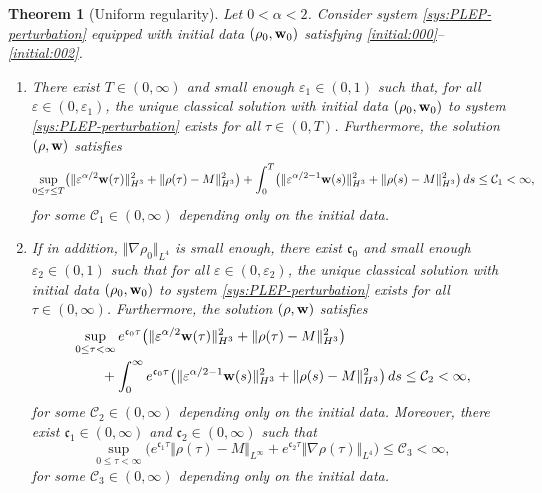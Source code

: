 \documentclass[11pt]{article}
\theoremstyle{plain}
\newtheorem{theorem}{Theorem}[section]
\theoremstyle{definition}
\theoremstyle{remark}
\renewcommand{\vec}[1]{{\bf #1}}
\newcommand{\norm}[2]{\Vert #1 \Vert_{#2}}
\numberwithin{equation}{section}
\begin{document}
\begin{theorem}[Uniform regularity]
    \label{thm:uniform}
    Let $ 0 < \alpha < 2 $.
    Consider system \eqref{sys:PLEP-perturbation} equipped with initial data $ (\rho_0, \vec w_0) $ satisfying \eqref{initial:000}--\eqref{initial:002}. 
    \begin{enumerate}[label = (\roman*), ref= \ref{thm:uniform} (\roman*)]
        \item \label{thm:uniform-1} There exist $ T \in (0,\infty) $ and small enough $ \varepsilon_1 \in (0,1) $ such that, for all $ \varepsilon \in (0,\varepsilon_1) $, the unique classical solution with initial data $ (\rho_0, \vec w_0) $ to system \eqref{sys:PLEP-perturbation} exists for all $ \tau \in (0,T) $. Furthermore, the solution $ (\rho, \vec w) $ satisfies
        \begin{equation}
            \label{est:thm-01}
            \sup_{0\leq \tau \leq T} \bigl( \norm{\varepsilon^{\alpha/2} \vec w(\tau)}{H^3}^2 + \norm{\rho(\tau)-M}{H^3}^2 \bigr) + \int_0^T \bigl( \norm{\varepsilon^{\alpha/2-1}\vec w(s)}{H^3}^2 + \norm{\rho(s)-M}{H^3}^2 \bigr) \,ds \leq \mathcal C_1 < \infty,  
        \end{equation}
        for some $ \mathcal C_1 \in (0,\infty) $ depending only on the initial data. 

        \item \label{thm:uniform-2} If in addition, $ \norm{\nabla \rho_0}{L^4} $ is small enough, there exist $ \mathfrak c_0 $ and small enough $ \varepsilon_2 \in (0,1) $ such that for all $ \varepsilon \in (0,\varepsilon_2) $, the unique classical solution with initial data $ (\rho_0, \vec w_0) $ to system \eqref{sys:PLEP-perturbation} exists for all $ \tau \in (0,\infty) $. Furthermore, the solution $ (\rho, \vec w) $ satisfies
        \begin{equation}
            \label{est:thm-02}
            \begin{aligned}
                & \sup_{0\leq \tau < \infty}  e^{\mathfrak c_0 \tau}  \bigl( \norm{\varepsilon^{\alpha/2} \vec w(\tau)}{H^3}^2 + \norm{\rho(\tau)-M}{H^3}^2  \bigr)  \\
                & \qquad + \int_0^\infty e^{\mathfrak c_0 \tau} \bigl( \norm{\varepsilon^{\alpha/2-1} \vec w(s)}{H^3}^2 + \norm{\rho(s)-M}{H^3}^2  \bigr) \,ds \leq \mathcal C_2 < \infty,
            \end{aligned}
        \end{equation}
        for some $ \mathcal C_2 \in (0,\infty) $ depending only on the initial data. Moreover, there exist $ \mathfrak c_1 \in (0,\infty) $ and $ \mathfrak c_2 \in (0,\infty)$ such that
        \begin{equation}
            \sup_{0\leq \tau < \infty} \bigl( e^{\mathfrak c_1 \tau} \norm{\rho(\tau)-M}{L^\infty} + e^{\mathfrak c_2 \tau} \norm{\nabla\rho(\tau)}{L^4} \bigr) \leq \mathcal C_3 < \infty, 
        \end{equation}
        for some $ \mathcal C_3 \in (0,\infty) $ depending only on the initial data. 
    \end{enumerate}
    
    
\end{theorem}
\end{document}
